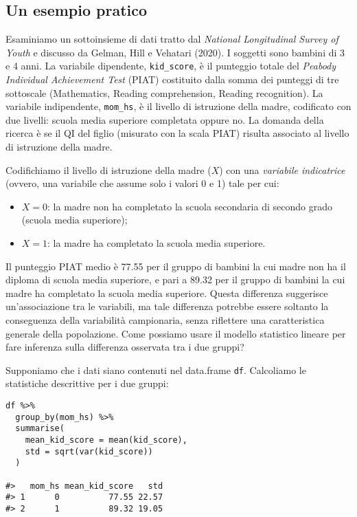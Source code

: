\subsection{Un esempio pratico}
\label{sec_var_ind_dico}

Esaminiamo un sottoinsieme di dati tratto dal \emph{National Longitudinal Survey of Youth} e discusso da Gelman, Hill e Vehatari (2020).
I soggetti sono bambini di 3 e 4 anni.
La variabile dipendente, \texttt{kid\_score}, è il punteggio totale del \emph{Peabody Individual Achievement Test} (PIAT) costituito dalla somma dei punteggi di tre sottoscale (Mathematics, Reading comprehension, Reading recognition). 
La variabile indipendente, \texttt{mom\_hs}, è il livello di istruzione della  madre, codificato con due livelli: scuola media superiore completata oppure no.
La domanda della ricerca è se il QI del figlio (misurato con la scala PIAT) risulta associato al livello di istruzione della madre.

Codifichiamo il livello di istruzione della madre ($X$) con una \emph{variabile indicatrice} (ovvero, una variabile che assume solo i valori 0 e 1) tale per cui:
\begin{itemize}
\item $X=0$: la madre non ha completato la scuola secondaria di secondo grado (scuola media superiore);
\item $X=1$: la madre ha completato la scuola media superiore.
\end{itemize}
Il punteggio PIAT medio è 77.55 per il gruppo di bambini la cui madre non ha il diploma di scuola media superiore, e pari a 89.32 per il gruppo di bambini la cui madre ha completato la scuola media superiore.
Questa differenza suggerisce un'associazione tra le variabili, ma tale differenza potrebbe essere soltanto la conseguenza della variabilità campionaria, senza riflettere una caratteristica generale della popolazione.
Come possiamo usare il modello statistico lineare per fare inferenza sulla differenza osservata tra i due gruppi?

Supponiamo che i dati siano contenuti nel data.frame \verb+df+.
Calcoliamo le statistiche descrittive per i due gruppi:




\begin{lstlisting}
df %>% 
  group_by(mom_hs) %>% 
  summarise(
    mean_kid_score = mean(kid_score),
    std = sqrt(var(kid_score))
  )

#>   mom_hs mean_kid_score   std
#> 1      0          77.55 22.57
#> 2      1          89.32 19.05
\end{lstlisting}
 


